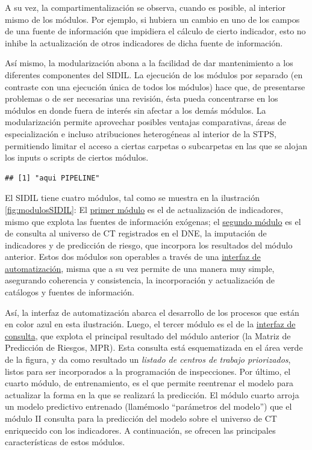 \documentclass[
]{article}
\begin{document}
A su vez, la compartimentalización se observa, cuando es posible, al interior mismo de los módulos. Por ejemplo, si hubiera un cambio en uno de los campos de una fuente de información que impidiera el cálculo de cierto indicador, esto no inhibe la actualización de otros indicadores de dicha fuente de información.

Así mismo, la modularización abona a la facilidad de dar mantenimiento a los diferentes componentes del SIDIL. La ejecución de los módulos por separado (en contraste con una ejecución única de todos los módulos) hace que, de presentarse problemas o de ser necesarias una revisión, ésta pueda concentrarse en los módulos en donde fuera de interés sin afectar a los demás módulos. La modularización permite aprovechar posibles ventajas comparativas, áreas de especialización e incluso atribuciones heterogéneas al interior de la STPS, permitiendo limitar el acceso a ciertas carpetas o subcarpetas en las que se alojan los inputs o scripts de ciertos módulos.

\begin{verbatim}
## [1] "aqui PIPELINE"
\end{verbatim}

El SIDIL tiene cuatro módulos, tal como se muestra en la ilustración \ref{fig:modulosSIDIL}: El \protect\hyperlink{moduloIexplicaciongeneral}{primer módulo} es el de actualización de indicadores, mismo que explota las fuentes de información exógenas; el \protect\hyperlink{moduloIIexplicaciongeneral}{segundo módulo} es el de consulta al universo de CT registrados en el DNE, la imputación de indicadores y de predicción de riesgo, que incorpora los resultados del módulo anterior. Estos dos módulos son operables a través de una \protect\hyperlink{moduloIyIIexplicaciongeneral}{interfaz de automatización}, misma que a su vez permite de una manera muy simple, asegurando coherencia y consistencia, la incorporación y actualización de catálogos y fuentes de información.

Así, la interfaz de automatización abarca el desarrollo de los procesos que están en color azul en esta ilustración. Luego, el tercer módulo es el de la \protect\hyperlink{interfazConsultaexplicaciongeneral}{interfaz de consulta}, que explota el principal resultado del módulo anterior (la Matriz de Predicción de Riesgos, MPR). Esta consulta está esquematizada en el área verde de la figura, y da como resultado un \emph{listado de centros de trabajo priorizados}, listos para ser incorporados a la programación de inspecciones. Por último, el cuarto módulo, de entrenamiento, es el que permite reentrenar el modelo para actualizar la forma en la que se realizará la predicción. El módulo cuarto arroja un modelo predictivo entrenado (llamémoslo ``parámetros del modelo'') que el módulo II consulta para la predicción del modelo sobre el universo de CT enriquecido con los indicadores. A continuación, se ofrecen las principales características de estos módulos.
\end{document}
